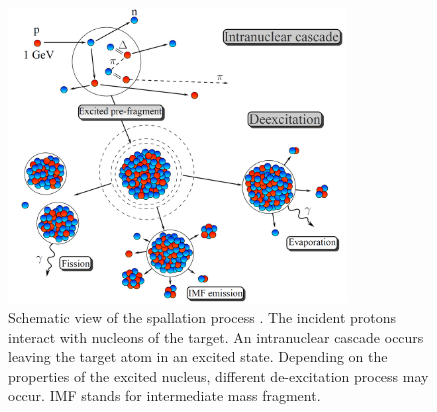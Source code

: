 \begin{figure}[!ht]
	\begin{center}
		\includegraphics[width=0.8\textwidth]{01_Introduction/figures/fig000_spallation}
	\end{center}
	\caption[Schematic view of the spallation process]{Schematic view of the spallation process \cite{gorbinet:tel-00660583}. The incident protons interact with nucleons of the target. An intranuclear cascade occurs leaving the target atom in an excited state. Depending on the properties of the excited nucleus, different de-excitation process may occur. IMF stands for intermediate mass fragment.}
	\label{chap1:fig:spallation}
\end{figure}
